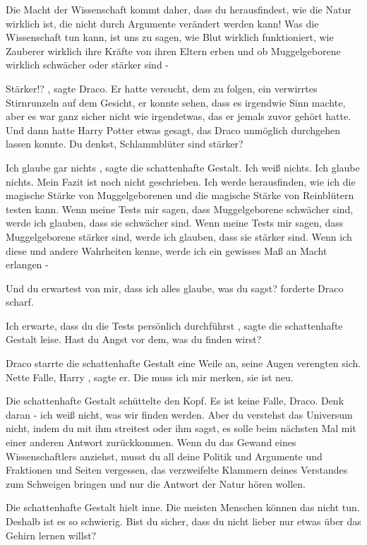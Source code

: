 Die Macht der Wissenschaft kommt daher, dass du herausfindest, wie die Natur
wirklich ist, die nicht durch Argumente verändert werden kann! Was die
Wissenschaft tun kann, ist uns zu sagen, wie Blut wirklich funktioniert, wie
Zauberer wirklich ihre Kräfte von ihren Eltern erben und ob Muggelgeborene
wirklich schwächer oder stärker sind -\grqq{}

\glqq Stärker!?\grqq{} , sagte Draco. Er hatte versucht, dem zu folgen, ein
verwirrtes Stirnrunzeln auf dem Gesicht, er konnte sehen, dass es irgendwie Sinn
machte, aber es war ganz sicher nicht wie irgendetwas, das er jemals zuvor
gehört hatte. Und dann hatte Harry Potter etwas gesagt, das Draco unmöglich
durchgehen lassen konnte. \glqq Du denkst, Schlammblüter sind stärker?\grqq{}

\glqq Ich glaube gar nichts\grqq{} , sagte die schattenhafte Gestalt. \glqq Ich
weiß nichts. Ich glaube nichts. Mein Fazit ist noch nicht geschrieben. Ich werde
herausfinden, wie ich die magische Stärke von Muggelgeborenen und die magische
Stärke von Reinblütern testen kann. Wenn meine Tests mir sagen, dass
Muggelgeborene schwächer sind, werde ich glauben, dass sie schwächer sind. Wenn
meine Tests mir sagen, dass Muggelgeborene stärker sind, werde ich glauben, dass
sie stärker sind. Wenn ich diese und andere Wahrheiten kenne, werde ich ein
gewisses Maß an Macht erlangen -\grqq{}

\glqq Und du erwartest von mir, dass ich alles glaube, was du sagst?\grqq{}
forderte Draco scharf.

\glqq Ich erwarte, dass du die Tests persönlich durchführst\grqq{} , sagte die
schattenhafte Gestalt leise. \glqq Hast du Angst vor dem, was du finden
wirst?\grqq{}

Draco starrte die schattenhafte Gestalt eine Weile an, seine Augen verengten
sich. \glqq Nette Falle, Harry\grqq{} , sagte er. \glqq Die muss ich mir merken,
sie ist neu.\grqq{}

Die schattenhafte Gestalt schüttelte den Kopf. \glqq Es ist keine Falle, Draco.
Denk daran - ich weiß nicht, was wir finden werden. Aber du verstehst das
Universum nicht, indem du mit ihm streitest oder ihm sagst, es solle beim
nächsten Mal mit einer anderen Antwort zurückkommen. Wenn du das Gewand eines
Wissenschaftlers anziehst, musst du all deine Politik und Argumente und
Fraktionen und Seiten vergessen, das verzweifelte Klammern deines Verstandes zum
Schweigen bringen und nur die Antwort der Natur hören wollen.\grqq{}

Die schattenhafte Gestalt hielt inne. \glqq Die meisten Menschen können das
nicht tun. Deshalb ist es so schwierig. Bist du sicher, dass du nicht lieber nur
etwas über das Gehirn lernen willst?\grqq{}

